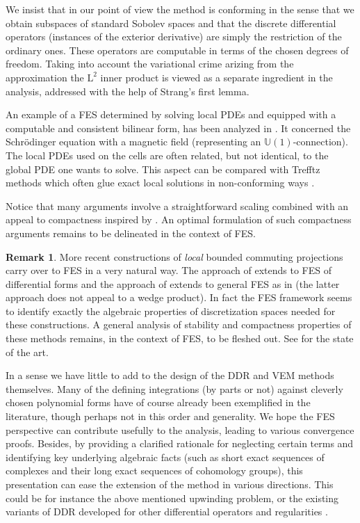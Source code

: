 \documentclass[10pt,a4paper]{article}
\newcommand{\rmL}{\mathrm{L}}
\newcommand{\bbU}{\mathbb{U}}
\theoremstyle{remark}
\theoremstyle{definition}
\newtheorem*{unremark}{Remark}
\numberwithin{equation}{section}
\begin{document}
We insist that in our point of view the method is conforming in the sense that we obtain subspaces of standard Sobolev spaces and that the discrete differential operators (instances of the exterior derivative) are simply the restriction of the ordinary ones. These operators are computable in terms of the chosen degrees of freedom. Taking into account the variational crime arizing from the approximation the $\rmL^2$ inner product is viewed as a separate ingredient in the analysis, addressed with the help of Strang's first lemma.

An example of a FES determined by solving local PDEs and equipped with a computable and consistent bilinear form, has been analyzed in \cite{ChrHal15}. It concerned the Schrödinger equation with a magnetic field (representing an $\bbU(1)$-connection). The local PDEs used on the cells are often related, but not identical, to the global PDE one wants to solve. This aspect can be compared with Trefftz methods which often glue exact local solutions in non-conforming ways \cite{HipMoiPer16}.

Notice that many arguments involve a straightforward scaling combined with an appeal to compactness inspired by \cite[Remark p. 64 and proof p. 69]{ArnFalWin06}. An optimal formulation of such compactness arguments remains to be delineated in the context of FES.

\begin{unremark}
More recent constructions of \emph{local} bounded commuting projections \cite{FalWin14, ArnGuz21} carry over to FES in a very natural way. The approach of \cite{FalWin14} extends to FES of differential forms and the approach of \cite{ArnGuz21} extends to general FES as in \cite{ChrHu23} (the latter approach does not appeal to a wedge product). In fact the FES framework seems to identify exactly the algebraic properties of discretization spaces needed for these constructions. A general analysis of stability and compactness properties of these methods remains, in the context of FES, to be fleshed out. See \cite{ErnGuzPotVoh25} for the state of the art.
\end{unremark}

In a sense we have little to add to the design of the DDR and VEM methods themselves. Many of the defining integrations (by parts or not) against cleverly chosen polynomial forms have of course already been exemplified in the literature, though perhaps not in this order and generality. We hope the FES perspective can contribute usefully to the analysis, leading to various convergence proofs. Besides, by providing a clarified rationale for neglecting certain terms and identifying key underlying algebraic facts (such as short exact sequences of complexes and their long exact sequences of cohomology groups), this presentation can ease the extension of the method in various directions. This could be for instance the above mentioned upwinding problem, or the existing variants of DDR developed for other differential operators \cite{DiPHan24} and regularities \cite{Han23}.
\end{document}
